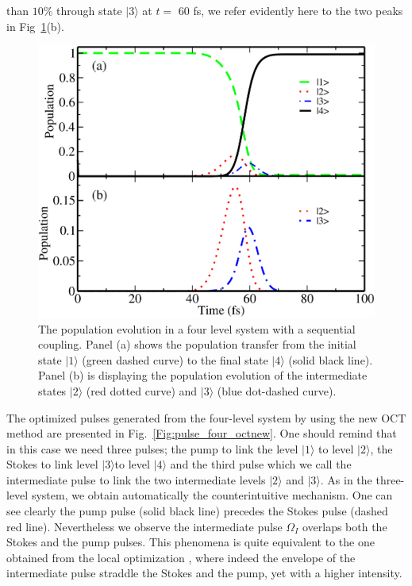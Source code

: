 \documentclass[]{interact}
\theoremstyle{plain}%
\theoremstyle{definition}
\theoremstyle{remark}
\begin{document}
than $10\%$ through state $|3\rangle$ at $t=$ 60 fs, we refer evidently here to 
the two peaks in Fig~\ref{Fig:pop_four_octnew}(b).
\begin{figure}[h!]
\centering
\includegraphics[width=0.7\linewidth]{Figure11}
\caption{The population evolution in a four level 
system with a sequential coupling. Panel (a) shows the population transfer from 
the initial state $|1\rangle$ (green dashed curve) to the final 
state $|4\rangle$ (solid black line). Panel (b) is displaying the population 
evolution of the intermediate states $|2\rangle$ (red dotted curve) 
and $|3\rangle$ (blue dot-dashed curve).
\label{Fig:pop_four_octnew}}
\end{figure}
The optimized pulses generated from the four-level system by using the new OCT 
method are presented in Fig.~\ref{Fig:pulse_four_octnew}. One should remind 
that in this case we need three pulses; the pump to link the level $|1\rangle$ 
to level $|2\rangle$, the Stokes to link level $|3\rangle$to level $|4\rangle$ 
and the third pulse which we call the intermediate pulse to link the two 
intermediate levels $|2\rangle$ and $|3\rangle$. 
As in the three-level system, we obtain automatically the counterintuitive 
mechanism. One can see clearly the pump pulse (solid black line) precedes the 
Stokes pulse (dashed red line). Nevertheless we observe the intermediate pulse 
$\Omega_I$ overlaps both the Stokes and the pump pulses. This phenomena is 
quite equivalent to the one obtained from the local optimization \cite{Tannor}, 
where indeed the envelope of the intermediate pulse straddle the Stokes and the 
pump, yet with a higher intensity.
\end{document}
